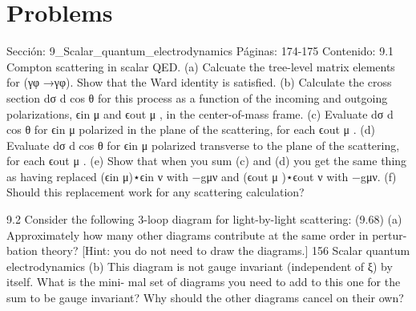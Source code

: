 \section*{Problems}
Sección: 9_Scalar_quantum_electrodynamics
Páginas: 174-175
Contenido:
9.1 Compton scattering in scalar QED.
(a) Calcuate the tree-level matrix elements for (γφ →γφ). Show that the Ward
identity is satisﬁed.
(b) Calculate the cross section
dσ
d cos θ for this process as a function of the incoming
and outgoing polarizations, ϵin
μ and ϵout
μ , in the center-of-mass frame.
(c) Evaluate
dσ
d cos θ for ϵin
μ polarized in the plane of the scattering, for each ϵout
μ .
(d) Evaluate
dσ
d cos θ for ϵin
μ polarized transverse to the plane of the scattering, for each
ϵout
μ .
(e) Show that when you sum (c) and (d) you get the same thing as having replaced
(ϵin
μ)⋆ϵin
ν with −gμν and (ϵout
μ )⋆ϵout
ν with −gμν.
(f) Should this replacement work for any scattering calculation?

9.2 Consider the following 3-loop diagram for light-by-light scattering:
(9.68)
(a) Approximately how many other diagrams contribute at the same order in pertur-
bation theory? [Hint: you do not need to draw the diagrams.]
156
Scalar quantum electrodynamics
(b) This diagram is not gauge invariant (independent of ξ) by itself. What is the mini-
mal set of diagrams you need to add to this one for the sum to be gauge invariant?
Why should the other diagrams cancel on their own?

